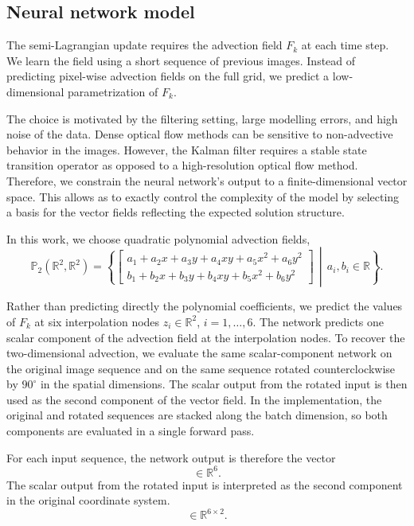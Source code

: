 \documentclass[a4paper,12pt]{article}
\begin{document}
\subsection{Neural network model}\label{subsec:nnmodel}
The semi-Lagrangian update requires the advection field $F_k$ at each time step.
We learn the field using a short sequence of previous images.
Instead of predicting pixel-wise advection fields on the full grid, we predict a low-dimensional parametrization of $F_k$.

The choice is motivated by the filtering setting, large modelling errors, and high noise of the data.
Dense optical flow methods can be sensitive to non-advective behavior in the images.
However, the Kalman filter requires a stable state transition operator as opposed to a high-resolution optical flow method.
Therefore, we constrain the neural network's output to a finite-dimensional vector space.
This allows as to exactly control the complexity of the model by selecting a basis for the vector fields reflecting the expected solution structure.

In this work, we choose quadratic polynomial advection fields,
\begin{equation}
    \mathbb{P}_2(\mathbb{R}^2, \mathbb{R}^2) =
    \left\{
        \begin{bmatrix}
            a_1 + a_2x + a_3y + a_4xy + a_5x^2 + a_6y^2\\
            b_1 + b_2x + b_3y + b_4xy + b_5x^2 + b_6y^2
        \end{bmatrix} \,
        \middle| \,
        a_i, b_i \in \mathbb{R}
    \right\}.
\end{equation}

Rather than predicting directly the polynomial coefficients, we predict the values of $F_k$ at six interpolation nodes $z_i \in \mathbb{R}^2$, $i=1, \ldots, 6$.
The network predicts one scalar component of the advection field at the interpolation nodes.
To recover the two-dimensional advection, we evaluate the same scalar-component network on the original image sequence and on the same sequence rotated counterclockwise by $90^{\circ}$ in the spatial dimensions.
The scalar output from the rotated input is then used as the second component of the vector field.
In the implementation, the original and rotated sequences are stacked along the batch dimension, so both components are evaluated in a single forward pass.

For each input sequence, the network output is therefore the vector
\begin{equation}
    [f_k(z_1), \ldots, f_k(z_6)] \in \mathbb{R}^{6}.
\end{equation}
The scalar output from the rotated input is interpreted as the second component in the original coordinate system.
\begin{equation}
    [F_k(z_1), \ldots, F_k(z_6)] \in \mathbb{R}^{6 \times 2}.
\end{equation}
\end{document}
